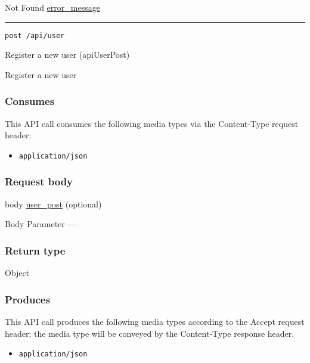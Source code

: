 Not Found \protect\hyperlink{error_message}{error\_message}

\begin{center}\rule{0.5\linewidth}{\linethickness}\end{center}

\protect\hypertarget{apiUserPost}{}{}

\begin{verbatim}
post /api/user
\end{verbatim}

Register a new user ({apiUserPost})

Register a new user

\hypertarget{consumes-40}{%
\subsubsection{Consumes}\label{consumes-40}}

This API call consumes the following media types via the {Content-Type}
request header:

\begin{itemize}
\tightlist
\item
  \texttt{application/json}
\end{itemize}

\hypertarget{request-body-40}{%
\subsubsection{Request body}\label{request-body-40}}

body \protect\hyperlink{user_post}{user\_post} (optional)

{Body Parameter} ---

\hypertarget{return-type-97}{%
\subsubsection{Return type}\label{return-type-97}}

Object

\hypertarget{produces-125}{%
\subsubsection{Produces}\label{produces-125}}

This API call produces the following media types according to the
{Accept} request header; the media type will be conveyed by the
{Content-Type} response header.

\begin{itemize}
\tightlist
\item
  \texttt{application/json}
\end{itemize}

